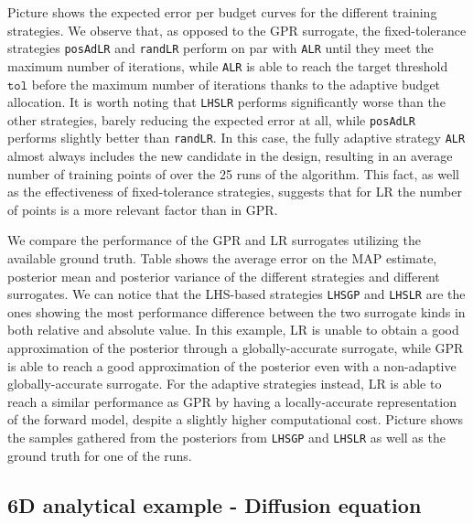 Picture  shows the expected error per budget curves for the different training strategies. 
We observe that, as opposed to the GPR surrogate, the fixed-tolerance strategies \texttt{posAdLR} and \texttt{randLR} perform on par with \texttt{ALR} until they meet the maximum number of iterations, while \texttt{ALR} is able to reach the target threshold $\texttt{tol}$ before the maximum number of iterations thanks to the adaptive budget allocation.
It is worth noting that \texttt{LHSLR} performs significantly worse than the other strategies, barely reducing the expected error at all, while \texttt{posAdLR} performs slightly better than \texttt{randLR}. 
In this case, the fully adaptive strategy \texttt{ALR} almost always includes the new candidate in the design, resulting in an average number of training points of  over the 25 runs of the algorithm.
This fact, as well as the effectiveness of fixed-tolerance strategies, suggests that for LR the number of points is a more relevant factor than in GPR. \medskip

We compare the performance of the GPR and LR surrogates utilizing the available ground truth.
Table  shows the average error on the MAP estimate, posterior mean and posterior variance of the different strategies and different surrogates.
We can notice that the LHS-based strategies \texttt{LHSGP} and \texttt{LHSLR} are the ones showing the most performance difference between the two surrogate kinds in both relative and absolute value. 
In this example, LR is unable to obtain a good approximation of the posterior through a globally-accurate surrogate, while GPR is able to reach a good approximation of the posterior even with a non-adaptive globally-accurate surrogate.
For the adaptive strategies instead, LR is able to reach a similar performance as GPR by having a locally-accurate representation of the forward model, despite a slightly higher computational cost.
Picture  shows the samples gathered from the posteriors from \texttt{LHSGP} and \texttt{LHSLR} as well as the ground truth for one of the runs.

\subsection{6D analytical example - Diffusion equation}\label{sec:6dexp}


